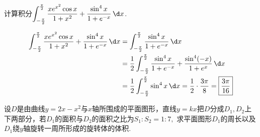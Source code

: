 \documentclass[12pt, a4paper, oneside, UTF8]{ctexbook}
\begin{document}
\begin{exercise}
    计算积分$\displaystyle\int_{-\frac{\pi}{2}}^{\frac{\pi}{2}} \dfrac{xe^{x^2}\cos x}{1+x^2}+\dfrac{\sin^4 x}{1+e^{-x}} \,\d x$.
\end{exercise}
\begin{solution}
    \begin{align*}
        \displaystyle\int_{-\frac{\pi}{2}}^{\frac{\pi}{2}} \dfrac{xe^{x^2}\cos x}{1+x^2}+\dfrac{\sin^4 x}{1+e^{-x}} \,\d x&=
        \int_{-\frac{\pi}{2}}^{\frac{\pi}{2}} \dfrac{\sin^4 x}{1+e^{-x}} \,\d x\\
        &=\dfrac{1}{2} \int_{-\frac{\pi}{2}}^{\frac{\pi}{2}} \dfrac{\sin^4 x}{1+e^{-x}} + \dfrac{\sin^4(-x)}{1+e^{x}} \,\d x\\
        &=\dfrac{1}{2} \int_{-\frac{\pi}{2}}^{\frac{\pi}{2}} \sin^4 x \,\d x
        =\dfrac{1}{2} \cdot \dfrac{3\pi}{8} = \boxed{\dfrac{3\pi}{16}}
    \end{align*}
\end{solution}
\begin{exercise}
    设$D$是由曲线$y=2x-x^2$与$x$轴所围成的平面图形，直线$y=kx$把$D$分成$D_1,D_2$上下两部分，若$D_1$的面积与$D_2$的面积之比为$S_1:S_2=1:7,$
    求平面图形$D_1$的周长以及$D_1$绕$y$轴旋转一周所形成的旋转体的体积.
\end{exercise}
\end{document}
